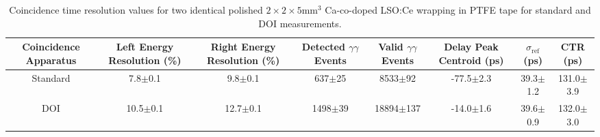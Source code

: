 \begin{table}
\caption{\label{tab:referencevals} Coincidence time resolution values for two identical polished $2\times2\times5$mm$^3$ Ca-co-doped LSO:Ce wrapping in PTFE tape for standard and DOI measurements.}
\begin{tabular}{cccccccc}
Coincidence Apparatus & Left Energy Resolution (\%) & Right Energy Resolution (\%) & Detected $\gamma\gamma$ Events & Valid $\gamma\gamma$ Events & Delay Peak Centroid (ps) & $\sigma_\textrm{ref}$ (ps) & CTR (ps)\\
\hline
Standard &   7.8$\pm$0.1 &   9.8$\pm$0.1 &   637$\pm$25 &    8533$\pm$92 &  -77.5$\pm$2.3 &   39.3$\pm$1.2 &  131.0$\pm$3.9 \\
     DOI &  10.5$\pm$0.1 &  12.7$\pm$0.1 &  1498$\pm$39 &  18894$\pm$137 &  -14.0$\pm$1.6 &   39.6$\pm$0.9 &  132.0$\pm$3.0 \\
\hline
\end{tabular}
\end{table}